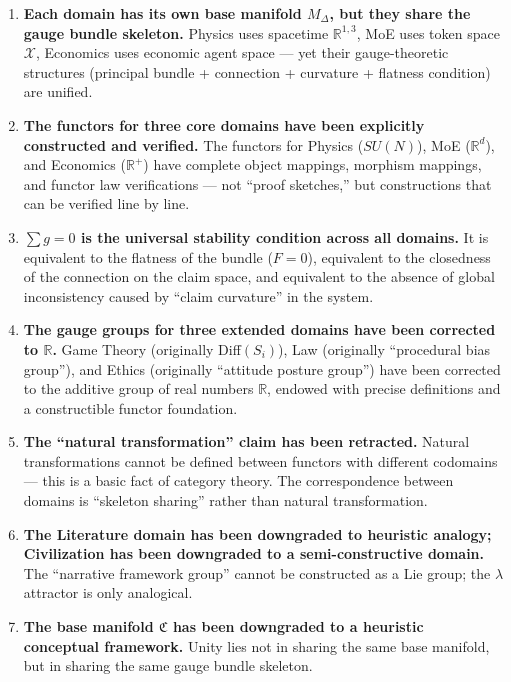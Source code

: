 \documentclass[12pt,a4paper]{article}
\theoremstyle{plain}
\theoremstyle{definition}
\newcommand{\R}{\mathbb{R}}
\newcommand{\curv}{F}
\newcommand{\ClaimSpace}{\mathfrak{C}}
\begin{document}
\begin{enumerate}[label=(\arabic*)]
    \item \textbf{Each domain has its own base manifold $M_\Delta$, but they share the gauge bundle skeleton.}
    Physics uses spacetime $\R^{1,3}$, MoE uses token space $\mathcal{X}$, Economics uses
    economic agent space — yet their gauge-theoretic structures (principal bundle + connection + curvature + flatness condition) are unified.

    \item \textbf{The functors for three core domains have been explicitly constructed and verified.}
    The functors for Physics ($SU(N)$), MoE ($\R^d$), and Economics ($\R^+$) have complete object mappings,
    morphism mappings, and functor law verifications — not ``proof sketches,'' but constructions that can be verified line by line.

    \item \textbf{$\sum g = 0$ is the universal stability condition across all domains.}
    It is equivalent to the flatness of the bundle ($\curv = 0$), equivalent to the closedness of the connection on the claim space,
    and equivalent to the absence of global inconsistency caused by ``claim curvature'' in the system.

    \item \textbf{The gauge groups for three extended domains have been corrected to $\R$.}
    Game Theory (originally Diff$(S_i)$), Law (originally ``procedural bias group''), and Ethics (originally ``attitude posture group'')
    have been corrected to the additive group of real numbers $\R$, endowed with precise definitions and a constructible functor foundation.

    \item \textbf{The ``natural transformation'' claim has been retracted.}
    Natural transformations cannot be defined between functors with different codomains — this is a basic fact of category theory. The correspondence between domains is
    ``skeleton sharing'' rather than natural transformation.

    \item \textbf{The Literature domain has been downgraded to heuristic analogy; Civilization has been downgraded to a semi-constructive domain.}
    The ``narrative framework group'' cannot be constructed as a Lie group; the $\lambda$ attractor is only analogical.

    \item \textbf{The base manifold $\ClaimSpace$ has been downgraded to a heuristic conceptual framework.}
    Unity lies not in sharing the same base manifold, but in sharing the same gauge bundle skeleton.
\end{enumerate}
\end{document}

